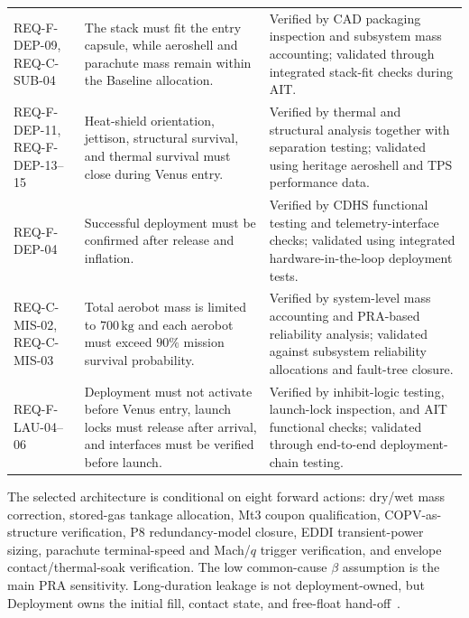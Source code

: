 \begin{table}[H]
\begin{tabularx}{\textwidth}{@{}p{} X X@{}}
REQ-F-DEP-09, REQ-C-SUB-04 &
The stack must fit the entry capsule, while aeroshell and parachute mass remain within the Baseline allocation. &
Verified by CAD packaging inspection and subsystem mass accounting; validated through integrated stack-fit checks during AIT. \\

REQ-F-DEP-11, REQ-F-DEP-13--15 &
Heat-shield orientation, jettison, structural survival, and thermal survival must close during Venus entry. &
Verified by thermal and structural analysis together with separation testing; validated using heritage aeroshell and TPS performance data. \\

REQ-F-DEP-04 &
Successful deployment must be confirmed after release and inflation. &
Verified by CDHS functional testing and telemetry-interface checks; validated using integrated hardware-in-the-loop deployment tests. \\

REQ-C-MIS-02, REQ-C-MIS-03 &
Total aerobot mass is limited to $700\,\mathrm{kg}$ and each aerobot must exceed $90\%$ mission survival probability. &
Verified by system-level mass accounting and PRA-based reliability analysis; validated against subsystem reliability allocations and fault-tree closure. \\

REQ-F-LAU-04--06 &
Deployment must not activate before Venus entry, launch locks must release after arrival, and interfaces must be verified before launch. &
Verified by inhibit-logic testing, launch-lock inspection, and AIT functional checks; validated through end-to-end deployment-chain testing. \\

\bottomrule
\end{tabularx}
\end{table}

The selected architecture is conditional on eight forward actions: dry/wet mass correction, stored-gas tankage allocation, Mt3 coupon qualification, COPV-as-structure verification, P8 redundancy-model closure, EDDI transient-power sizing, parachute terminal-speed and Mach/$q$ trigger verification, and envelope contact/thermal-soak verification. The low common-cause $\beta$ assumption is the main PRA sensitivity. Long-duration leakage is not deployment-owned, but Deployment owns the initial fill, contact state, and free-float hand-off~\cite{Yavrouian2003,Bugga2022}.